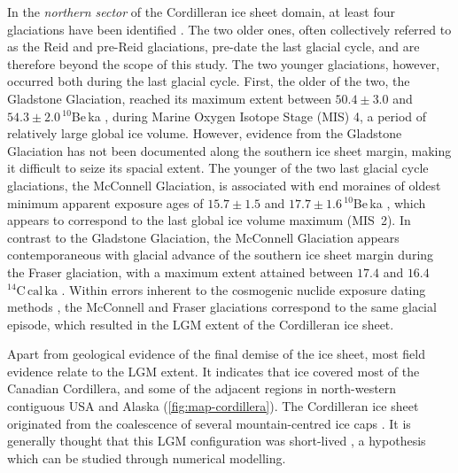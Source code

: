 \documentclass{article}
\newcommand{\unit}[1]{\ensuremath{\mathrm{#1}}}
\begin{document}
In the \emph{northern sector} of the Cordilleran ice sheet domain, at least
four glaciations have been identified
    \citep{Duk-Rodkin.1999, Ward.etal.2007, Ward.etal.2008,
           Briner.Kaufman.2008, Demuro.etal.2012,
           Stroeven.etal.2010, Stroeven.etal.2014}.
The two older ones, often collectively referred to as the Reid and pre-Reid
glaciations, pre-date the last glacial cycle, and are therefore beyond the
scope of this study. The two younger glaciations, however, occurred both during
the last glacial cycle. First, the older of the two, the Gladstone Glaciation,
reached its maximum extent between $50.4\pm3.0$ and $54.3\pm2.0\,^{10}$Be\,ka
\citep{Ward.etal.2007}, during Marine Oxygen Isotope Stage (MIS) 4, a period of
relatively large global ice volume. However, evidence from the Gladstone
Glaciation has not been documented along the southern ice sheet margin, making
it difficult to seize its spacial extent. The younger of the two last glacial
cycle glaciations, the McConnell Glaciation, is associated with end moraines of
oldest minimum apparent exposure ages of $15.7\pm1.5$ and
$17.7\pm1.6\,^{10}$Be\,ka \citep{Stroeven.etal.2014}, which appears to
correspond to the last global ice volume maximum (MIS~2). In contrast to the
Gladstone Glaciation, the McConnell Glaciation appears contemporaneous with
glacial advance of the southern ice sheet margin during the Fraser glaciation,
with a maximum extent attained between $17.4$ and
$16.4$\,\unit{^{14}C\,cal\,ka} \citep{Porter.Swanson.1998}. Within errors
inherent to the cosmogenic nuclide exposure dating methods
\citep{Heyman.etal.2011}, the McConnell and Fraser glaciations correspond to
the same glacial episode, which resulted in the LGM extent of the Cordilleran
ice sheet.

Apart from geological evidence of the final demise of the ice sheet, most field
evidence relate to the LGM extent. It indicates that ice covered most of the
Canadian Cordillera, and some of the adjacent regions in north-western
contiguous USA and Alaska (\cref{fig:map-cordillera}). The Cordilleran ice
sheet originated from the coalescence of several mountain-centred ice caps
\citep{Davis.Mathews.1944}. It is generally thought that this LGM configuration
was short-lived \citep{Clague.etal.1980, Clague.1985, Cosma.etal.2008}, a
hypothesis which can be studied through numerical modelling.
\end{document}
